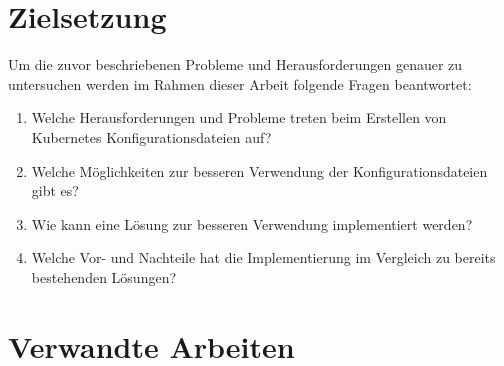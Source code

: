 \section{Zielsetzung}
Um die zuvor beschriebenen Probleme und Herausforderungen genauer zu untersuchen werden im Rahmen dieser Arbeit folgende Fragen beantwortet:
\begin{enumerate}
    \item Welche Herausforderungen und Probleme treten beim Erstellen von Kubernetes Konfigurationsdateien auf?
    \item Welche Möglichkeiten zur besseren Verwendung der Konfigurationsdateien gibt es?
    \item Wie kann eine Lösung zur besseren Verwendung implementiert werden?
    \item Welche Vor- und Nachteile hat die Implementierung im Vergleich zu bereits bestehenden Lösungen?
\end{enumerate}

\section{Verwandte Arbeiten}\label{sec:introduction-related-work}


